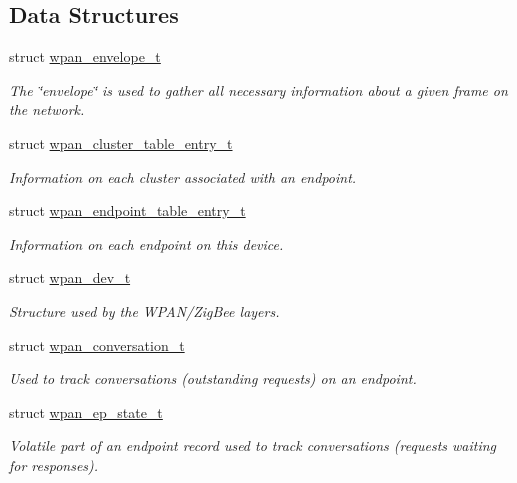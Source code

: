 \subsection*{Data Structures}
\begin{DoxyCompactItemize}
\item 
struct \hyperlink{structwpan__envelope__t}{wpan\+\_\+envelope\+\_\+t}
\begin{DoxyCompactList}\small\item\em The \char`\"{}envelope\char`\"{} is used to gather all necessary information about a given frame on the network. \end{DoxyCompactList}\item 
struct \hyperlink{structwpan__cluster__table__entry__t}{wpan\+\_\+cluster\+\_\+table\+\_\+entry\+\_\+t}
\begin{DoxyCompactList}\small\item\em Information on each cluster associated with an endpoint. \end{DoxyCompactList}\item 
struct \hyperlink{structwpan__endpoint__table__entry__t}{wpan\+\_\+endpoint\+\_\+table\+\_\+entry\+\_\+t}
\begin{DoxyCompactList}\small\item\em Information on each endpoint on this device. \end{DoxyCompactList}\item 
struct \hyperlink{structwpan__dev__t}{wpan\+\_\+dev\+\_\+t}
\begin{DoxyCompactList}\small\item\em Structure used by the W\+P\+A\+N/\+Zig\+Bee layers. \end{DoxyCompactList}\item 
struct \hyperlink{structwpan__conversation__t}{wpan\+\_\+conversation\+\_\+t}
\begin{DoxyCompactList}\small\item\em Used to track conversations (outstanding requests) on an endpoint. \end{DoxyCompactList}\item 
struct \hyperlink{structwpan__ep__state__t}{wpan\+\_\+ep\+\_\+state\+\_\+t}
\begin{DoxyCompactList}\small\item\em Volatile part of an endpoint record used to track conversations (requests waiting for responses). \end{DoxyCompactList}\end{DoxyCompactItemize}
